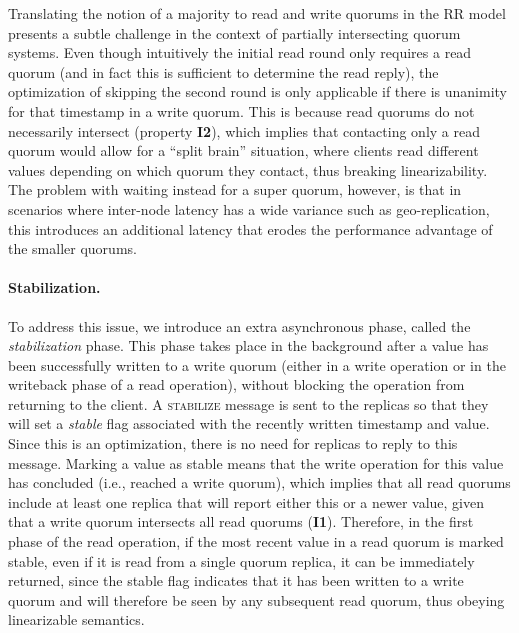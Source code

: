 Translating the notion of a majority to read and write quorums in the
\ac{RR} model presents a subtle challenge in the context of
partially intersecting quorum systems. Even though
intuitively the initial read round only requires a read quorum (and in
fact this is sufficient to determine the read reply), the optimization
of skipping the second round is only applicable if there is unanimity
for that timestamp in a write quorum. This is because read quorums do
not necessarily intersect (property \textbf{I2}), which implies that
contacting only a read quorum would allow for a ``split brain''
situation, where clients read different values depending on which
quorum they contact, thus breaking linearizability. The problem with
waiting instead for a super quorum, however, is that in scenarios
where inter-node latency has a wide variance such as geo-replication,
this introduces an additional latency that erodes the performance
advantage of the smaller quorums.






\paragraph{Stabilization.}
To address this issue, we introduce an extra asynchronous phase,
called the \emph{stabilization} phase. This phase takes
place in the background after a value has been successfully
written to a write quorum (either in a write operation or in the
writeback phase of a read operation), without
blocking the operation from returning to the client. A
\textsc{stabilize} message is sent to the replicas so that they
will set a \emph{stable} flag associated with the recently
written timestamp and value. Since this is an optimization, there
is no need for replicas to reply to this message.  Marking a
value as stable means that the write operation for this value has
concluded (i.e., reached a write quorum), which implies that all
read quorums include at least one replica that will report either
this or a newer value, given that a write quorum intersects all
read quorums (\textbf{I1}). Therefore, in the first phase of the
read operation, if the most recent value in a read quorum is
marked stable, even if it is read from a single quorum replica, it can
be immediately returned, since the stable flag indicates that it
has been written to a write quorum and will therefore be seen by
any subsequent read quorum, thus obeying linearizable semantics.

